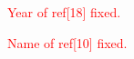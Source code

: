 \documentclass[10pt,nocopyrightspace,preprint]{sigplanconf}
\newcommand{\hl}[1]{\textcolor{red}{#1}}
\begin{document}




\hl{Year of ref[18] fixed.}

\hl{Name of ref[10] fixed.}





\appendix

\begin{comment}
\section{Appendix Title}

This is the text of the appendix, if you need one.

\acks

Acknowledgments, if needed.





\begin{thebibliography}{}
\softraggedright

\bibitem[Smith et~al.(2009)Smith, Jones]{smith02}
P. Q. Smith, and X. Y. Jones. ...reference text...

\end{thebibliography}
\end{comment}
\end{document}
